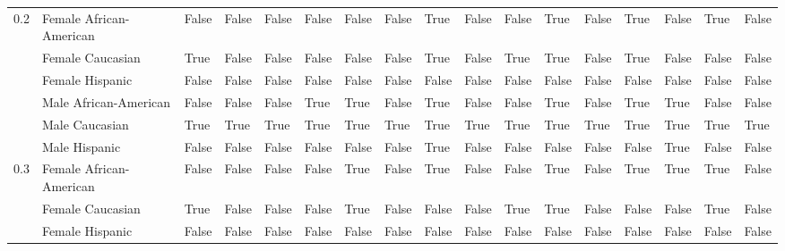 \begin{tabular}{lllllllllllllllll}
0.2 & Female African-American &       False &           False &                  False &               False &       False &                False &        True &       False &             False &        True &         False &           True &       False &           True &       False \\
    & Female Caucasian &        True &           False &                  False &               False &       False &                False &        True &       False &              True &        True &         False &           True &       False &          False &       False \\
    & Female Hispanic &       False &           False &                  False &               False &       False &                False &       False &       False &             False &       False &         False &          False &       False &          False &       False \\
    & Male African-American &       False &           False &                  False &                True &        True &                False &        True &       False &             False &        True &         False &           True &        True &          False &       False \\
    & Male Caucasian &        True &            True &                   True &                True &        True &                 True &        True &        True &              True &        True &          True &           True &        True &           True &        True \\
    & Male Hispanic &       False &           False &                  False &               False &       False &                False &        True &       False &             False &       False &         False &          False &        True &          False &       False \\
0.3 & Female African-American &       False &           False &                  False &               False &        True &                False &        True &       False &             False &        True &         False &           True &        True &           True &       False \\
    & Female Caucasian &        True &           False &                  False &               False &        True &                False &       False &       False &              True &        True &         False &          False &       False &           True &       False \\
    & Female Hispanic &       False &           False &                  False &               False &       False &                False &       False &       False &             False &       False &         False &          False &       False &          False &       False \\

\end{tabular}
